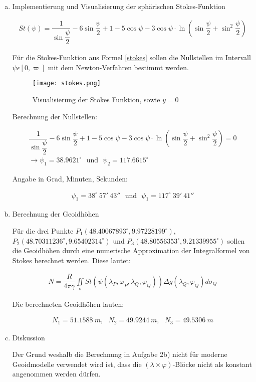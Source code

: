 \begin{enumerate}[a)]
\item  Implementierung und Visualisierung der sphärischen Stokes-Funktion 

\begin{align}
St(\psi) = \dfrac{1}{\sin \dfrac{\psi}{2}} - 6 \sin \dfrac{\psi}{2} + 1 - 5 \cos \psi - 3 \cos \psi \cdot \ln \left(\sin \dfrac{\psi}{2} + \sin^2 \dfrac{\psi}{2}\right)
\label{stokes}
\end{align}

Für die Stokes-Funktion aus Formel \ref{stokes} sollen die Nullstellen im Intervall $\psi \epsilon [0,\varpi]$ mit dem Newton-Verfahren bestimmt werden.  

\begin{figure}[H]
\centering 
\texttt{[image: stokes.png]}
\caption{Visualisierung der Stokes Funktion, sowie $y=0$}
\label{stfkt}
\end{figure}

Berechnung der Nullstellen: 

\begin{gather*}
\dfrac{1}{\sin \dfrac{\psi}{2}} - 6 \sin \dfrac{\psi}{2} + 1 - 5 \cos \psi - 3 \cos \psi \cdot \ln \left(\sin \dfrac{\psi}{2} + \sin^2 \dfrac{\psi}{2}\right) = 0 \\ 
\rightarrow \psi_1 = 38.9621^{\circ} ~~~ \text{und} ~~~ \psi_2 = 117.6615^{\circ}
\end{gather*}

Angabe in Grad, Minuten, Sekunden: 

\begin{gather*}
\psi_1 = 38^{\circ} ~57' ~43'' ~~~ \text{und} ~~~ \psi_1 = 117^{\circ} ~39' ~41''
\end{gather*}

\item Berechnung der Geoidhöhen

Für die drei Punkte $P_1(48.40067893^{\circ},9.97228199^{\circ})$, $P_2(48.70311236^{\circ},9.65402314^{\circ})$ und $P_3(48.80556353^{\circ},9.21339955^{\circ})$ sollen die Geoidhöhen durch eine numerische Approximation der Integralformel von Stokes berechnet werden. Diese lautet: 

\begin{gather*}
N = \dfrac{R}{4 \pi \gamma} \iint\limits_\sigma St(\psi(\lambda_P,\varphi_P,\lambda_Q,\varphi_Q))\Delta g (\lambda_Q,\varphi_Q) d\sigma_Q 
\end{gather*}

Die berechneten Geoidhöhen lauten: 

\begin{gather*}
N_1 = 51.1588~m, ~~~ N_2 = 49.9244~m, ~~~ N_3 = 49.5306~m
\end{gather*}

\item Diskussion

Der Grund weshalb die Berechnung in Aufgabe 2b) nicht für moderne Geoidmodelle verwendet wird ist, dass die $(\lambda \times \varphi)$-Blöcke nicht als konstant angenommen werden dürfen. 

\end{enumerate}

